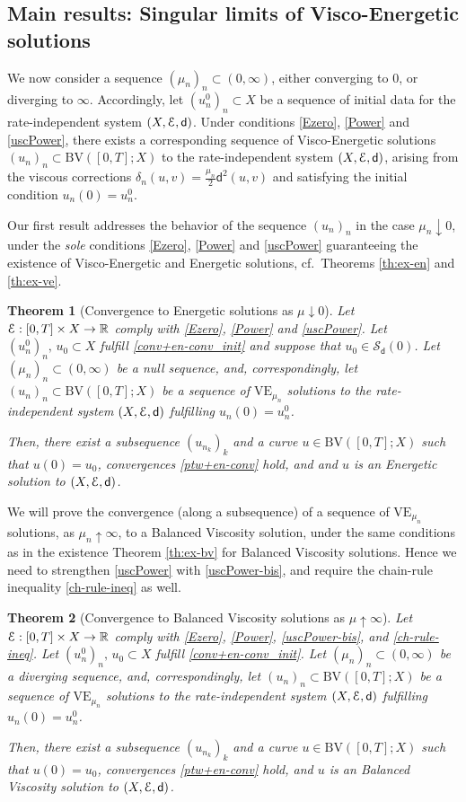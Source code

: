 \documentclass[a4paper,10pt,reqno]{amsart} %
\newcommand{\R}{\mathbb{R}}
\newtheorem{maintheorem}{Theorem}
\numberwithin{equation}{section}
\newcommand{\down}{\downarrow}
\newcommand{\Xs}{X}
\newcommand{\BV}{\mathrm{BV}}
\newcommand{\mdn}{\mathsf{d}}
\newcommand{\corrn}[2]{\delta_n(#1,#2)}
\newcommand{\RIS}{(\Xs,\calE,\mdn)}
\newcommand{\VEa}[1]{\mathrm{VE}_{#1}}
\newcommand{\VEn}{\VEa{\mu_n}}
\newcommand{\stabi}[2]{\mathscr{S}_{#1}(#2)}
\begin{document}
\subsection{Main results:   Singular limits of  Visco-Energetic solutions}
\label{ss:2.4}
We now consider a sequence $(\mu_n)_n\subset (0,\infty)$, either converging to $0$, or diverging to $\infty$.
 Accordingly, let $(u_n^0)_n\subset \Xs$ be  a sequence of initial data for  the rate-independent system $\RIS$. Under conditions  \eqref{Ezero}, \eqref{Power} and \eqref{uscPower}, there exists a corresponding sequence of Visco-Energetic solutions $(u_n)_n\subset \BV([0,T];\Xs)$ to the rate-independent system $\RIS$, arising from the  viscous corrections $\corrn uv=\tfrac{\mu_n}2 \mdn^2(u,v)$ and  satisfying the initial condition $u_n(0)=u_n^0$.
 \par
 Our first result addresses the behavior of the sequence $(u_n)_n$ in the case $\mu_n\down 0$, under the \emph{sole} conditions   \eqref{Ezero}, \eqref{Power} and \eqref{uscPower} guaranteeing the existence of Visco-Energetic and Energetic solutions, cf.\ Theorems \ref{th:ex-en} and \ref{th:ex-ve}.
\begin{maintheorem}[Convergence to Energetic solutions as $\mu \down 0$]
\label{th:1}
  Let $\calE: [0,T]\times \Xs \to \R$ comply with  \eqref{Ezero}, \eqref{Power} and \eqref{uscPower}. Let  $(u_n^0)_n,\, u_0\subset \Xs$ fulfill \eqref{conv+en-conv_init}
and suppose that $u_0 \in \stabi \mdn 0$. 
Let $(\mu_n)_n \subset (0,\infty)$ be a null sequence, and, correspondingly, let $(u_n)_n\subset \BV([0,T];\Xs)$ be a sequence of   $\VEn$   solutions to  the rate-independent system $\RIS$  fulfilling $u_n(0)=u_n^0$. 
\par
Then, there exist a subsequence  $(u_{n_k})_k$  and  a curve $u\in \BV([0,T];\Xs)$ such that  $u(0)=u_0$,  convergences \eqref{ptw+en-conv} hold, and 
and $u$ is an Energetic solution to $\RIS$.
\end{maintheorem}
\par
We will prove the convergence 
 (along a subsequence) of a sequence of  $\VEn$   solutions, as $\mu_n\uparrow \infty$, to a Balanced Viscosity solution,  
 under the same conditions as in  the existence Theorem \ref{th:ex-bv} for Balanced Viscosity solutions. 
 Hence we need to strengthen \eqref{uscPower}  with  \eqref{uscPower-bis}, and require the chain-rule inequality \eqref{ch-rule-ineq} as well. 
\begin{maintheorem}[Convergence to Balanced Viscosity solutions as $\mu \uparrow \infty$]
\label{th:2}
  Let $\calE: [0,T]\times \Xs \to \R$ comply with  \eqref{Ezero}, \eqref{Power}, \eqref{uscPower-bis}, and  \eqref{ch-rule-ineq}.
  Let  $(u_n^0)_n,\, u_0\subset \Xs$ fulfill 
  \eqref{conv+en-conv_init}.
Let $(\mu_n)_n \subset (0,\infty)$ be a diverging sequence, and, correspondingly, let $(u_n)_n\subset \BV([0,T];\Xs)$ be a sequence of  $\VEn$   solutions to  the rate-independent system $\RIS$   fulfilling $u_n(0)=u_n^0$. 
\par
Then, there exist a subsequence  $(u_{n_k})_k$  and  a curve $u\in \BV([0,T];\Xs)$ such that  $u(0)=u_0$, convergences \eqref{ptw+en-conv} hold,
and $u$ is an Balanced Viscosity solution to $\RIS$.
\end{maintheorem}
\end{document}

